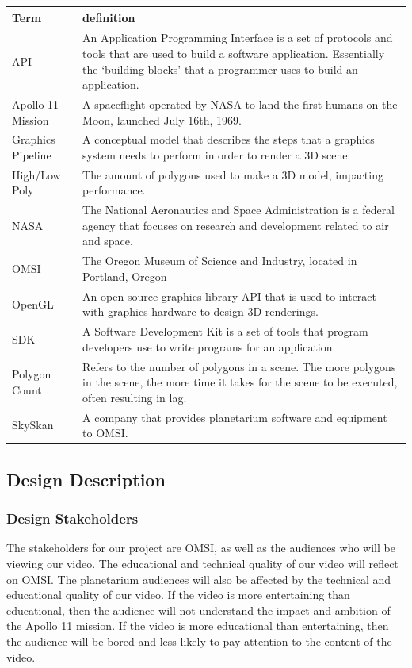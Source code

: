 \documentclass[onecolumn, draftclsnofoot,10pt, compsoc]{IEEEtran}
\begin{document}
\begin{tabular} {|l|p{13.5cm}|}
\hline
Term & definition \\ \hline
API & An Application Programming Interface is a set of protocols and tools that are used to build a software application. Essentially the `building blocks' that a programmer uses to build an application.  \\ \hline
Apollo 11 Mission & A spaceflight operated by NASA to land the first humans on the Moon, launched July 16th, 1969.  \\ \hline
Graphics Pipeline & A conceptual model that describes the steps that a graphics system needs to perform in order to render a 3D scene. \\ \hline
High/Low Poly & The amount of polygons used to make a 3D model, impacting performance.\\ \hline
NASA & The National Aeronautics and Space Administration is a federal agency that focuses on research and development related to air and space.	\\ \hline
OMSI & The Oregon Museum of Science and Industry, located in Portland, Oregon	\\ \hline
OpenGL & An open-source graphics library API that is used to interact with graphics hardware to design 3D renderings.	\\ \hline
SDK & A Software Development Kit is a set of tools that program developers use to write programs for an application. \\ \hline
Polygon Count & Refers to the number of polygons in a scene. The more polygons in the scene, the more time it takes for the scene to be executed, often resulting in lag. \\ \hline
SkySkan & A company that provides planetarium software and equipment to OMSI. \\ \hline

\end{tabular}

\subsection{Design Description}

    \subsubsection{Design Stakeholders}
    The stakeholders for our project are OMSI, as well as the audiences who will be viewing our video. The educational and technical quality of our video will reflect on OMSI. The planetarium audiences will also be affected by the technical and educational quality of our video. If the video is more entertaining than educational, then the audience will not understand the impact and ambition of the Apollo 11 mission. If the video is more educational than entertaining, then the audience will be bored and less likely to pay attention to the content of the video.
    
\end{document}
